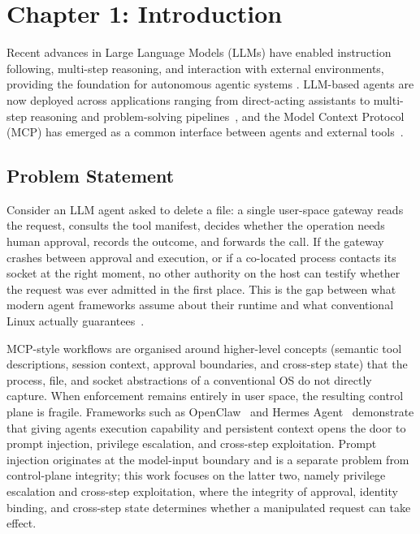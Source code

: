 \section*{Chapter 1: Introduction}
\setcounter{section}{1} \setcounter{subsection}{0}
 \label{chap:introduction} 

Recent advances in Large Language Models (LLMs) have enabled instruction following, multi-step reasoning, and interaction with external environments, providing the foundation for autonomous agentic systems \cite{yao2023react, schick2023toolformer}.
LLM-based agents are now deployed across applications ranging from direct-acting assistants to multi-step reasoning and problem-solving pipelines~\cite{park2023generative, qin2024toolllm}, and the Model Context Protocol (MCP) has emerged as a common interface between agents and external tools~\cite{mcp2025}.

\subsection{Problem Statement}

Consider an LLM agent asked to delete a file: a single user-space gateway reads the request, consults the tool manifest, decides whether the operation needs human approval, records the outcome, and forwards the call.
If the gateway crashes between approval and execution, or if a co-located process contacts its socket at the right moment, no other authority on the host can testify whether the request was ever admitted in the first place.
This is the gap between what modern agent frameworks assume about their runtime and what conventional Linux actually guarantees~\cite{packer2023memgpt, mei2024aios}.

MCP-style workflows are organised around higher-level concepts (semantic tool descriptions, session context, approval boundaries, and cross-step state) that the process, file, and socket abstractions of a conventional OS do not directly capture.
When enforcement remains entirely in user space, the resulting control plane is fragile.
Frameworks such as OpenClaw~\cite{openclaw2026} and Hermes Agent~\cite{nousresearch2026hermesagent} demonstrate that giving agents execution capability and persistent context opens the door to prompt injection, privilege escalation, and cross-step exploitation.
Prompt injection originates at the model-input boundary and is a separate problem from control-plane integrity; this work focuses on the latter two, namely privilege escalation and cross-step exploitation, where the integrity of approval, identity binding, and cross-step state determines whether a manipulated request can take effect.


